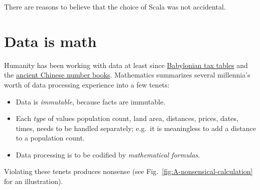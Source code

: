 There are reasons to believe that the choice of Scala was not accidental.

\section{Data is math}

Humanity has been working with data at least since \href{https://www.nytimes.com/2017/08/29/science/trigonometry-babylonian-tablet.html?mcubz=0}{Babylonian tax tables}
and the \href{http://quatr.us/china/science/chinamath.htm}{ancient Chinese number books}.
Mathematics summarizes several millennia's worth of data processing
experience into a few tenets:
\begin{itemize}
\item Data is \emph{immutable}, because facts are immutable. 
\item Each \emph{type} of values \textendash{} population count, land area,
distances, prices, dates, times, \textendash{} needs to be handled
separately; e.g.\ it is meaningless to add a distance to a population
count.
\item Data processing is to be codified by \emph{mathematical formulas}. 
\end{itemize}
Violating these tenets produces nonsense (see Fig.\ \ref{fig:A-nonsensical-calculation}
for an illustration).

